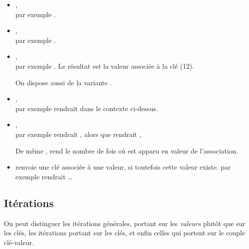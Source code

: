 \begin{itemize} 
\item {},\\
par exemple .

\item {},\\
par exemple .

\item {},\\
par exemple . Le r\'esultat est la valeur associ\'ee \`a la cl\'e (12).

On dispose aussi de la variante  .

\item {},\\
par exemple  rendrait  dans le contexte ci-dessus.

\item {},\\
par exemple  rendrait , alors que
 rendrait , 

De m\^eme  , rend le nombre de fois
o\`u  est apparu en valeur de l'association.
\item {} renvoie une cl\'e associ\'ee
\`a une valeur, si toutefois cette valeur existe.
 par exemple  rendrait \ldots
\end{itemize}

\subsection{It\'erations}
On peut distinguer les it\'erations g\'en\'erales, portant sur les \emph{valeurs}
plut\^ot que sur les cl\'es, les it\'erations portant sur les cl\'es, et enfin 
celles qui portent sur le couple cl\'e-valeur.

